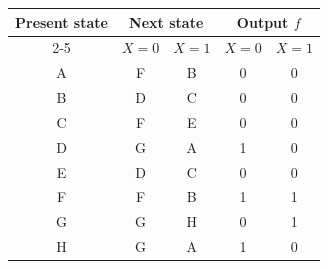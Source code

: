 \renewcommand{\arraystretch}{1.1}
\begin{tabular}{|c|cc|cc|}
\hline
\multirow{2}{*}{Present state}
& \multicolumn{2}{c|}{Next state}
& \multicolumn{2}{c|}{Output $f$} \\
\cline{2-5}
& $X=0$ & $X=1$ & $X=0$ & $X=1$ \\
\hline
A & F & B & 0 & 0 \\
B & D & C & 0 & 0 \\
C & F & E & 0 & 0 \\
D & G & A & 1 & 0 \\
E & D & C & 0 & 0 \\
F & F & B & 1 & 1 \\
G & G & H & 0 & 1 \\
H & G & A & 1 & 0 \\
\hline
\end{tabular}
